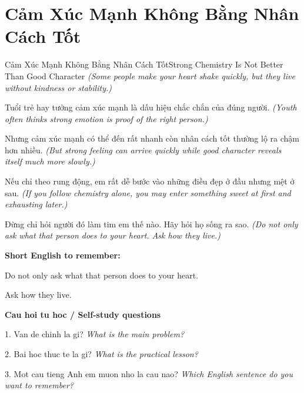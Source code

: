 \section{Cảm Xúc Mạnh Không Bằng Nhân Cách Tốt}
\begin{truyen}{Cảm Xúc Mạnh Không Bằng Nhân Cách Tốt}{Strong Chemistry Is Not Better Than Good Character}
\textit{(Some people make your heart shake quickly, but they live without kindness or stability.)}

Tuổi trẻ hay tưởng cảm xúc mạnh là dấu hiệu chắc chắn của đúng người.
\textit{(Youth often thinks strong emotion is proof of the right person.)}

Nhưng cảm xúc mạnh có thể đến rất nhanh còn nhân cách tốt thường lộ ra chậm hơn nhiều.
\textit{(But strong feeling can arrive quickly while good character reveals itself much more slowly.)}

Nếu chỉ theo rung động, em rất dễ bước vào những điều đẹp ở đầu nhưng mệt ở sau.
\textit{(If you follow chemistry alone, you may enter something sweet at first and exhausting later.)}

\end{truyen}

\begin{baihoc}
Đừng chỉ hỏi người đó làm tim em thế nào. Hãy hỏi họ sống ra sao.
\textit{(Do not only ask what that person does to your heart. Ask how they live.)}
\end{baihoc}

\begin{ghinhoanh}
\textbf{Short English to remember:}

Do not only ask what that person does to your heart.

Ask how they live.

\end{ghinhoanh}

\begin{tuhocnhanh}
\textbf{Cau hoi tu hoc / Self-study questions}

1. Van de chinh la gi? \textit{What is the main problem?}

2. Bai hoc thuc te la gi? \textit{What is the practical lesson?}

3. Mot cau tieng Anh em muon nho la cau nao? \textit{Which English sentence do you want to remember?}
\end{tuhocnhanh}
\ngancach

